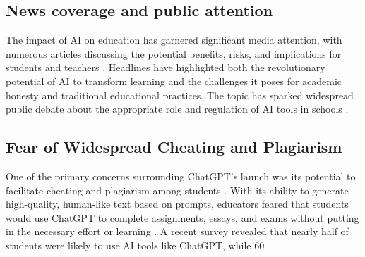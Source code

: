 \documentclass{article}
\begin{document}
\subsection{News coverage and public attention}
The impact of AI on education has garnered significant media attention, with numerous articles discussing the potential benefits, risks, and implications for students and teachers \cite{https://www.bbc.com/news/education-67433036} \cite{https://www.tampabay.com/opinion/2024/02/22/artificial-intelligence-education-return-once-feared-calculator-or-new-opportunity/} \cite{https://theweek.com/education/ai-in-schools-machine-learning}. Headlines have highlighted both the revolutionary potential of AI to transform learning and the challenges it poses for academic honesty and traditional educational practices. The topic has sparked widespread public debate about the appropriate role and regulation of AI tools in schools \cite{https://www.tampabay.com/opinion/2024/02/22/artificial-intelligence-education-return-once-feared-calculator-or-new-opportunity/} \cite{https://theweek.com/education/ai-in-schools-machine-learning}.
\subsection{Fear of Widespread Cheating and Plagiarism}
One of the primary concerns surrounding ChatGPT's launch was its potential to facilitate cheating and plagiarism among students \cite{https://oai.missouri.edu/chatgpt-artificial-intelligence-and-academic-integrity/} \cite{https://informationmatters.org/2023/02/chatgpt-and-academic-integrity/} \cite{https://www.reddit.com/r/changemyview/comments/123m3xr/cmv_using_chatgpt_for_academic_purposes_is_not_an/}. With its ability to generate high-quality, human-like text based on prompts, educators feared that students would use ChatGPT to complete assignments, essays, and exams without putting in the necessary effort or learning \cite{https://oai.missouri.edu/chatgpt-artificial-intelligence-and-academic-integrity/} \cite{https://www.reddit.com/r/changemyview/comments/123m3xr/cmv_using_chatgpt_for_academic_purposes_is_not_an/}.
A recent survey revealed that nearly half of students were likely to use AI tools like ChatGPT, while 60%
\end{document}
